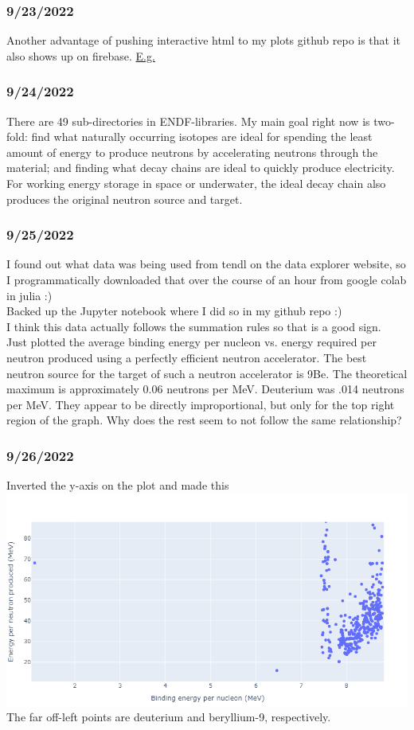 \documentclass[12pt]{article}
\begin{document}
\subsubsection{9/23/2022}
Another advantage of pushing interactive html to my plots github repo is that it also shows up on firebase.  \href{https://mp7635plots.web.app/avg_b_energy_vs_half_life.html}{E.g.}
\subsubsection{9/24/2022}
There are 49 sub-directories in ENDF-libraries. My main goal right now is two-fold: find what naturally occurring isotopes are ideal for spending the least amount of energy to produce neutrons by accelerating neutrons through the material; and finding what decay chains are ideal to quickly produce electricity. For working energy storage in space or underwater, the ideal decay chain also produces the original neutron source and target.
\subsubsection{9/25/2022}
I found out what data was being used from tendl on the data explorer website, so I programmatically downloaded that over the course of an hour from google colab in julia :) \\
Backed up the Jupyter notebook where I did so in my github repo :)\\
I think this data actually follows the summation rules so that is a good sign.\\
Just plotted the average binding energy per nucleon vs. energy required per neutron produced using a perfectly efficient neutron accelerator. The best neutron source for the target of such a neutron accelerator is 9Be. The theoretical maximum is approximately 0.06 neutrons per MeV. Deuterium was .014 neutrons per MeV. They appear to be directly improportional, but only for the top right region of the graph. Why does the rest seem to not follow the same relationship? 
\subsubsection{9/26/2022}
Inverted the y-axis on the plot and made this\\
\includegraphics[scale=.6]{Images/binding_energy_vs_energy_per_neutron.png}\\
The far off-left points are deuterium and beryllium-9, respectively. 
\end{document}
